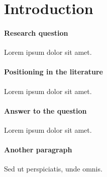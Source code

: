 \documentclass[paper.tex]{subfiles}
\begin{document}
\section{Introduction}\label{s:intro}

\paragraph{Research question} Lorem ipsum dolor sit amet. \citet{MS21a}

\paragraph{Positioning in the literature} Lorem ipsum dolor sit amet.

\paragraph{Answer to the question} Lorem ipsum dolor sit amet.

\paragraph{Another paragraph} Sed ut perspiciatis, unde omnis. 
\end{document}
